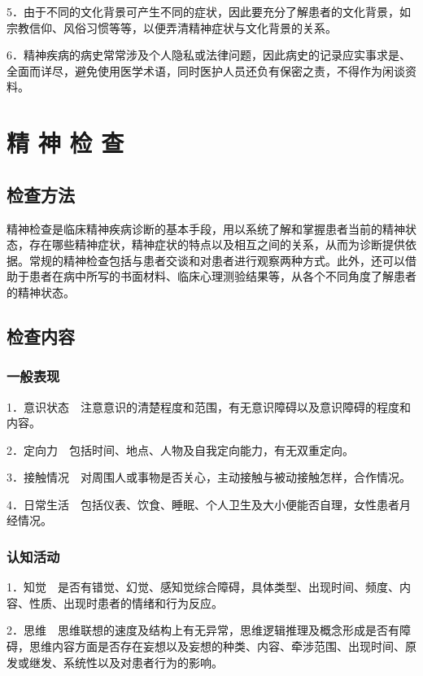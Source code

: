 5．由于不同的文化背景可产生不同的症状，因此要充分了解患者的文化背景，如宗教信仰、风俗习惯等等，以便弄清精神症状与文化背景的关系。

6．精神疾病的病史常常涉及个人隐私或法律问题，因此病史的记录应实事求是、全面而详尽，避免使用医学术语，同时医护人员还负有保密之责，不得作为闲谈资料。

\section{精 神 检 查}

\subsection{检查方法}

精神检查是临床精神疾病诊断的基本手段，用以系统了解和掌握患者当前的精神状态，存在哪些精神症状，精神症状的特点以及相互之间的关系，从而为诊断提供依据。常规的精神检查包括与患者交谈和对患者进行观察两种方式。此外，还可以借助于患者在病中所写的书面材料、临床心理测验结果等，从各个不同角度了解患者的精神状态。

\subsection{检查内容}

\subsubsection{一般表现}

1．意识状态　注意意识的清楚程度和范围，有无意识障碍以及意识障碍的程度和内容。

2．定向力　包括时间、地点、人物及自我定向能力，有无双重定向。

3．接触情况　对周围人或事物是否关心，主动接触与被动接触怎样，合作情况。

4．日常生活　包括仪表、饮食、睡眠、个人卫生及大小便能否自理，女性患者月经情况。

\subsubsection{认知活动}

1．知觉　是否有错觉、幻觉、感知觉综合障碍，具体类型、出现时间、频度、内容、性质、出现时患者的情绪和行为反应。

2．思维　思维联想的速度及结构上有无异常，思维逻辑推理及概念形成是否有障碍，思维内容方面是否存在妄想以及妄想的种类、内容、牵涉范围、出现时间、原发或继发、系统性以及对患者行为的影响。

